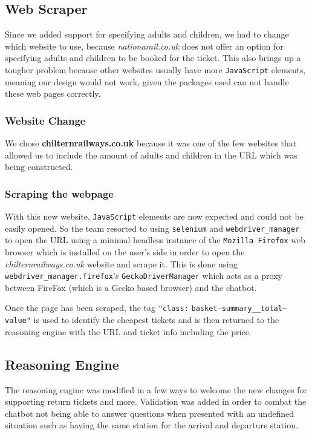 \documentclass[11pt]{article}
\newcommand{\code}[1]{{\texttt{#1}}}
\begin{document}
    \subsection{Web Scraper}
    Since we added support for specifying adults and children, we had to change which website to use, because \textit{nationarail.co.uk} does not offer an option for specifying adults and children to be booked for the ticket. This also brings up a tougher problem because other websites usually have more \code{JavaScript} elements, meaning our design would not work, given the packages used can not handle these web pages correctly.

        \subsubsection{Website Change}
        We chose \textbf{chilternrailways.co.uk} because it was one of the few websites that allowed us to include the amount of adults and children in the URL which was being constructed.

        \subsubsection{Scraping the webpage}
        With this new website, \code{JavaScript} elements are now expected and could not be easily opened. So the team resorted to using \code{selenium} and \code{webdriver\_manager} to open the URL using a minimal headless instance of the \code{Mozilla Firefox} web browser which is installed on the user's side in order to open the \textit{chilternrailways.co.uk} website and scrape it. This is done using \code{webdriver\_manager.firefox}'s \code{GeckoDriverManager} which acts as a proxy between FireFox (which is a Gecko based browser) and the chatbot.
        
        Once the page has been scraped, the tag \code{"class:} \code{basket-summary\_\_total--value"} is used to identify the cheapest tickets and is then returned to the reasoning engine with the URL and ticket info including the price.



    \subsection{Reasoning Engine}
    The reasoning engine was modified in a few ways to welcome the new changes for supporting return tickets and more. Validation was added in order to combat the chatbot not being able to answer questions when presented with an undefined situation such as having the same station for the arrival and departure station.
    
\end{document}
